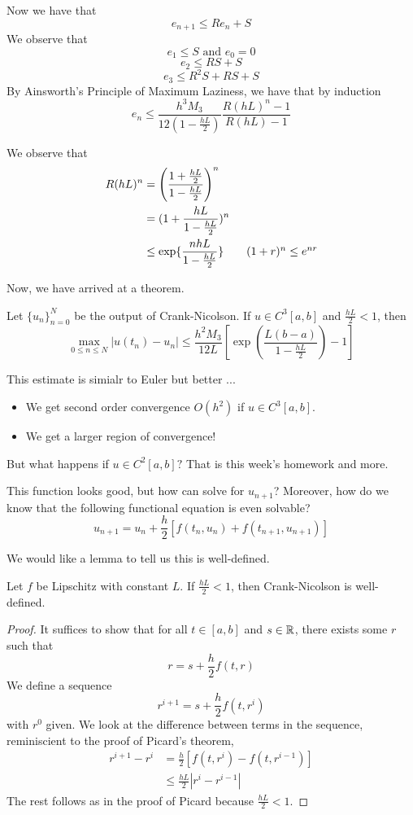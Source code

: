 \documentclass{article}
\begin{document}
Now we have that
\[e_{n+1} \leq R e_n + S\]
We observe that
\[e_1 \leq S \text{ and } e_0 = 0\]
\[e_2 \leq RS + S\]
\[e_3 \leq R^2 S + R S + S\]
By Ainsworth's Principle of Maximum Laziness, we have that by induction
\[e_n \leq \frac{h^3 M_3}{12 (1 - \frac{hL}{2})} \frac{R(hL)^n - 1}{R(hL) - 1}\]

We observe that
\begin{align*}
    R(hL)^n &= \left( \frac{1 + \frac{hL}{2}}{1 - \frac{hL}{2}} \right)^n\\
    &= (1 + \frac{hL}{1 - \frac{hL}{2}})^n\\
    &\leq \exp \{\frac{nhL}{1 - \frac{hL}{2}}\} \tag*{$(1 + r)^n \leq e^{nr}$}
\end{align*}

Now, we have arrived at a theorem.

\begin{theorem}
    Let $\{u_n\}_{n=0}^N$ be the output of Crank-Nicolson. If $u \in C^3[a, b]$ and $\frac{hL}{2} < 1$, then
    \[\max_{0 \leq n \leq N} |u(t_n) - u_n| \leq \frac{h^2 M_3}{12 L} [\exp (\frac{L (b-a)}{1 - \frac{hL}{2}}) - 1]\]
\end{theorem}

\begin{remark}
    This estimate is simialr to Euler but better ...
    \begin{itemize}
        \item We get second order convergence $O(h^2)$ if $u \in C^3[a, b]$.
        \item We get a larger region of convergence!
    \end{itemize}
    But what happens if $u \in C^2[a, b]?$ That is this week's homework and more.
\end{remark}

This function looks good, but how can solve for $u_{n+1}$? Moreover, how do we know that the following functional equation is even solvable?
\[u_{n+1} = u_n + \frac{h}{2} [f(t_n, u_n) + f(t_{n+1}, u_{n+1})]\]

We would like a lemma to tell us this is well-defined.

\begin{lemma}
   Let $f$ be Lipschitz with constant $L$. If $\frac{hL}{2} < 1$, then Crank-Nicolson is well-defined. 
\end{lemma}

\begin{proof}
    It suffices to show that for all $t \in [a, b]$ and $s \in \mathbb{R}$, there exists some $r$ such that
    \[r = s + \frac{h}{2} f(t, r)\]
    We define a sequence
    \[r^{i+1} = s + \frac{h}{2} f(t, r^i)\]
    with $r^0$ given. We look at the difference between terms in the sequence, reminiscient to the proof of Picard's theorem,
    \begin{align*}
        r^{i+1} - r^i &= \frac{h}{2} [f(t, r^i) - f(t, r^{i-1})]\\
        &\leq \frac{hL}{2} |r^i - r^{i-1}| \tag*{Lipschitz continuity}
    \end{align*}
    The rest follows as in the proof of Picard because $\frac{hL}{2} < 1$.
\end{proof}
\end{document}
